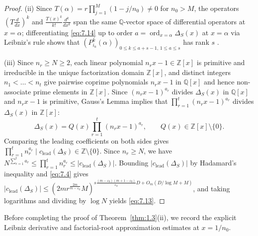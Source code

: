 \documentclass[11pt,reqno]{amsart}
\theoremstyle{remark}
\numberwithin{equation}{section}
\newcommand{\Z}{\mathbb{Z}}
\newcommand{\Q}{\mathbb{Q}}
\DeclareMathOperator{\ord}{ord}
\begin{document}
\begin{proof}
(ii) Since $T(\alpha) = r\prod_{j=1}^M (1 - j/n_0) \ne 0$ for $n_0 > M$, the operators $(T\frac{d}{dx})^k$ and $\frac{T(x)^k}{k!}\frac{d^k}{dx^k}$ span the same $\Q$-vector space of differential operators at $x = \alpha$; differentiating \eqref{eq:7.14} up to order $a = \ord_{x=\alpha} \Delta_S(x)$ at $x = \alpha$ via Leibniz's rule shows that $(P_{i_a}^k(\alpha))_{0 \le k \le a+s-1,\, 1 \le a \le s}$ has rank $s$ \cite[Lemmas~5.6 and 6.3]{BuiPrattZaharescu2023}.

(iii) Since $n_r \ge N \ge 2$, each linear polynomial $n_r x - 1 \in \Z[x]$ is primitive and irreducible in the unique factorization domain $\Z[x]$, and distinct integers $n_1 < \dots < n_t$ give pairwise coprime polynomials $n_r x - 1$ in $\Q[x]$ and hence non-associate prime elements in $\Z[x]$. Since $(n_r x - 1)^{a_r}$ divides $\Delta_S(x)$ in $\Q[x]$ and $n_r x - 1$ is primitive, Gauss's Lemma implies that $\prod_{r=1}^t (n_r x - 1)^{a_r}$ divides $\Delta_S(x)$ in $\Z[x]$:
\[
\Delta_S(x) = Q(x) \prod_{r=1}^t (n_r x - 1)^{a_r}, \qquad Q(x) \in \Z[x] \setminus \{0\}.
\]
Comparing the leading coefficients on both sides gives $\prod_{r=1}^t n_r^{a_r} \mid c_{\mathrm{lead}}(\Delta_S) \in \Z \setminus \{0\}$. Since $n_r \ge N$, we have $N^{\sum_{r=1}^t a_r} \le \prod_{r=1}^t n_r^{a_r} \le |c_{\mathrm{lead}}(\Delta_S)|$. Bounding $|c_{\mathrm{lead}}(\Delta_S)|$ by Hadamard's inequality and \eqref{eq:7.4} gives $|c_{\mathrm{lead}}(\Delta_S)| \le (2mr^{\frac{2m}{m-\varepsilon_0}} M)^{s\frac{(m-\varepsilon_0)(m+1-\varepsilon_0)}{\varepsilon_0}D + O_m(D/\log M + M)}$, and taking logarithms and dividing by $\log N$ yields \eqref{eq:7.13}.
\end{proof}

Before completing the proof of Theorem~\ref{thm:1.3}(ii), we record the explicit Leibniz derivative and factorial-root approximation estimates at $x = 1/n_0$.
\end{document}
